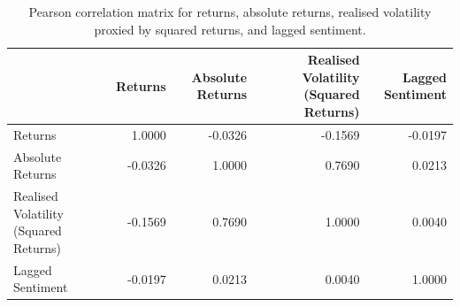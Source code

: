 \begin{table}
\caption{Pearson correlation matrix for returns, absolute returns, realised volatility proxied by squared returns, and lagged sentiment.}
\label{tab:correlation}
\begin{tabular}{lrrrr}
\toprule
 & Returns & Absolute Returns & Realised Volatility (Squared Returns) & Lagged Sentiment \\
\midrule
Returns & 1.0000 & -0.0326 & -0.1569 & -0.0197 \\
Absolute Returns & -0.0326 & 1.0000 & 0.7690 & 0.0213 \\
Realised Volatility (Squared Returns) & -0.1569 & 0.7690 & 1.0000 & 0.0040 \\
Lagged Sentiment & -0.0197 & 0.0213 & 0.0040 & 1.0000 \\
\bottomrule
\end{tabular}
\end{table}
